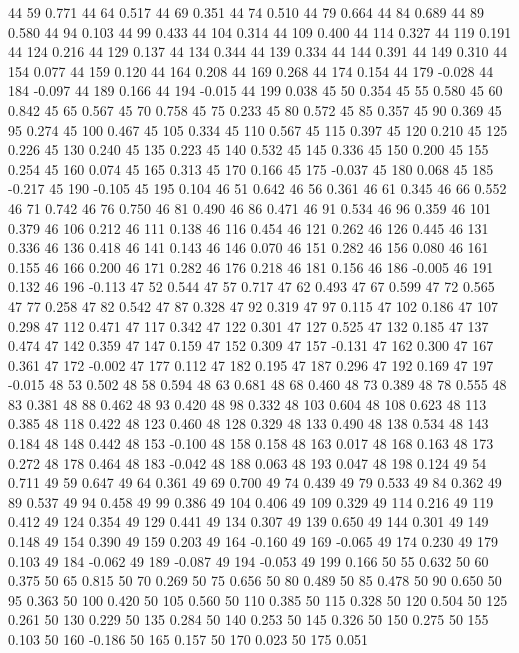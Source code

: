 44 59 0.771
44 64 0.517
44 69 0.351
44 74 0.510
44 79 0.664
44 84 0.689
44 89 0.580
44 94 0.103
44 99 0.433
44 104 0.314
44 109 0.400
44 114 0.327
44 119 0.191
44 124 0.216
44 129 0.137
44 134 0.344
44 139 0.334
44 144 0.391
44 149 0.310
44 154 0.077
44 159 0.120
44 164 0.208
44 169 0.268
44 174 0.154
44 179 -0.028
44 184 -0.097
44 189 0.166
44 194 -0.015
44 199 0.038
45 50 0.354
45 55 0.580
45 60 0.842
45 65 0.567
45 70 0.758
45 75 0.233
45 80 0.572
45 85 0.357
45 90 0.369
45 95 0.274
45 100 0.467
45 105 0.334
45 110 0.567
45 115 0.397
45 120 0.210
45 125 0.226
45 130 0.240
45 135 0.223
45 140 0.532
45 145 0.336
45 150 0.200
45 155 0.254
45 160 0.074
45 165 0.313
45 170 0.166
45 175 -0.037
45 180 0.068
45 185 -0.217
45 190 -0.105
45 195 0.104
46 51 0.642
46 56 0.361
46 61 0.345
46 66 0.552
46 71 0.742
46 76 0.750
46 81 0.490
46 86 0.471
46 91 0.534
46 96 0.359
46 101 0.379
46 106 0.212
46 111 0.138
46 116 0.454
46 121 0.262
46 126 0.445
46 131 0.336
46 136 0.418
46 141 0.143
46 146 0.070
46 151 0.282
46 156 0.080
46 161 0.155
46 166 0.200
46 171 0.282
46 176 0.218
46 181 0.156
46 186 -0.005
46 191 0.132
46 196 -0.113
47 52 0.544
47 57 0.717
47 62 0.493
47 67 0.599
47 72 0.565
47 77 0.258
47 82 0.542
47 87 0.328
47 92 0.319
47 97 0.115
47 102 0.186
47 107 0.298
47 112 0.471
47 117 0.342
47 122 0.301
47 127 0.525
47 132 0.185
47 137 0.474
47 142 0.359
47 147 0.159
47 152 0.309
47 157 -0.131
47 162 0.300
47 167 0.361
47 172 -0.002
47 177 0.112
47 182 0.195
47 187 0.296
47 192 0.169
47 197 -0.015
48 53 0.502
48 58 0.594
48 63 0.681
48 68 0.460
48 73 0.389
48 78 0.555
48 83 0.381
48 88 0.462
48 93 0.420
48 98 0.332
48 103 0.604
48 108 0.623
48 113 0.385
48 118 0.422
48 123 0.460
48 128 0.329
48 133 0.490
48 138 0.534
48 143 0.184
48 148 0.442
48 153 -0.100
48 158 0.158
48 163 0.017
48 168 0.163
48 173 0.272
48 178 0.464
48 183 -0.042
48 188 0.063
48 193 0.047
48 198 0.124
49 54 0.711
49 59 0.647
49 64 0.361
49 69 0.700
49 74 0.439
49 79 0.533
49 84 0.362
49 89 0.537
49 94 0.458
49 99 0.386
49 104 0.406
49 109 0.329
49 114 0.216
49 119 0.412
49 124 0.354
49 129 0.441
49 134 0.307
49 139 0.650
49 144 0.301
49 149 0.148
49 154 0.390
49 159 0.203
49 164 -0.160
49 169 -0.065
49 174 0.230
49 179 0.103
49 184 -0.062
49 189 -0.087
49 194 -0.053
49 199 0.166
50 55 0.632
50 60 0.375
50 65 0.815
50 70 0.269
50 75 0.656
50 80 0.489
50 85 0.478
50 90 0.650
50 95 0.363
50 100 0.420
50 105 0.560
50 110 0.385
50 115 0.328
50 120 0.504
50 125 0.261
50 130 0.229
50 135 0.284
50 140 0.253
50 145 0.326
50 150 0.275
50 155 0.103
50 160 -0.186
50 165 0.157
50 170 0.023
50 175 0.051
